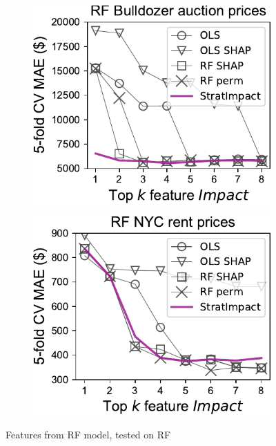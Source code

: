 \documentclass[11pt]{article}
\begin{document}
\begin{figure}
\begin{subfigure}{.245\textwidth}
    \centering
\includegraphics[scale=0.45]{images/bulldozer-topk-RF-Impact.pdf}
\end{subfigure}%
\hfill
\begin{subfigure}{.245\textwidth}
    \centering
\includegraphics[scale=0.45]{images/rent-topk-RF-Impact.pdf}
\end{subfigure}
\caption[short]{Features from RF model, tested on RF}
\label{fig:topk-impact}
\end{figure}
\end{document}
